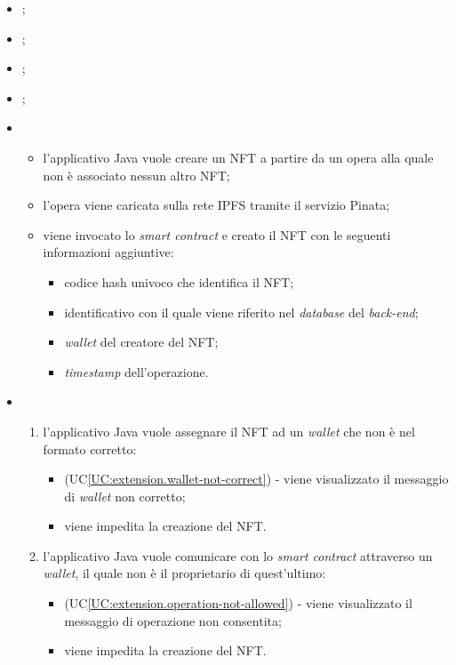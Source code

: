 \begin{itemize}
  \item {};
  \item {};
  \item {};
  \item {};
  \item \UCMain
  \begin{itemize}
    \item l'applicativo Java vuole creare un NFT a partire da un opera alla quale non è associato nessun altro NFT;
    \item l'opera viene caricata sulla rete IPFS tramite il servizio Pinata;
    \item viene invocato lo \textit{smart contract} e creato il NFT con le seguenti informazioni aggiuntive:
    \begin{itemize}
      \item codice hash univoco che identifica il NFT;
      \item identificativo con il quale viene riferito nel \textit{database} del \textit{back-end};
      \item \textit{wallet} del creatore del NFT;
      \item \textit{timestamp} dell'operazione.
    \end{itemize}
  \end{itemize}
  \item \UCExt
  \begin{enumerate}[label=\lett]
    \item l'applicativo Java vuole assegnare il NFT ad un \textit{wallet} che non è nel formato corretto:
    \begin{itemize}
      \item (UC\ref{UC:extension.wallet-not-correct}) - viene visualizzato il messaggio di \textit{wallet} non corretto;
      \item viene impedita la creazione del NFT.
    \end{itemize}

    \item l'applicativo Java vuole comunicare con lo \textit{smart contract} attraverso un \textit{wallet}, il quale non è il proprietario di quest'ultimo:
    \begin{itemize}
      \item (UC\ref{UC:extension.operation-not-allowed}) - viene visualizzato il messaggio di operazione non consentita;
      \item viene impedita la creazione del NFT.
    \end{itemize}


\end{enumerate}
\end{itemize}
